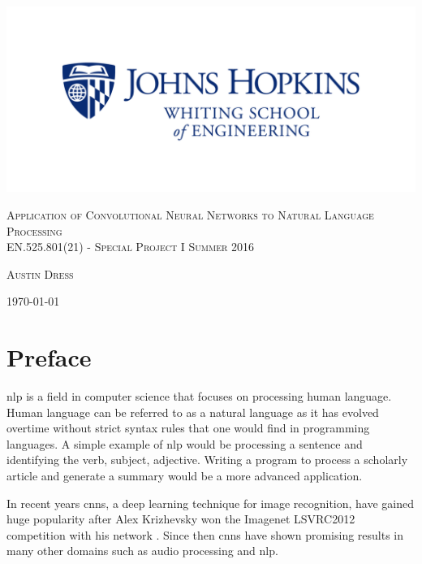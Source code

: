 \documentclass[12pt]{article}
\begin{document}
\begin{titlepage}
	\centering
	\includegraphics[width=\textwidth]{jhu_logo.png}\par\vspace{2cm}
	{\scshape\Huge Application of Convolutional Neural Networks to Natural Language Processing \\
	\vspace{1.5cm}
	 \scshape\Large EN.525.801(21) - Special Project I Summer 2016\par}
	{\scshape \Large Austin Dress\par} 
	\vspace{0.75cm}
	\vfill
	{\large \today\par}
\end{titlepage}

\tableofcontents
\listoftables

\newpage

\section{Preface} 
\ac{nlp} is a field in computer science that focuses on processing human language. Human language can be referred to as a natural language as it has evolved overtime without strict syntax rules that one would find in programming languages. A simple example of \ac{nlp} would be processing a sentence and identifying the verb, subject, adjective. Writing a program to process a scholarly article and generate a summary would be a more advanced application.

In recent years \ac{cnn}s, a deep learning technique for image recognition, have gained huge popularity after Alex Krizhevsky won the Imagenet LSVRC2012 competition with his network \cite{alex}. Since then \ac{cnn}s have shown promising results in many other domains such as audio processing and \ac{nlp}. 
\end{document}
